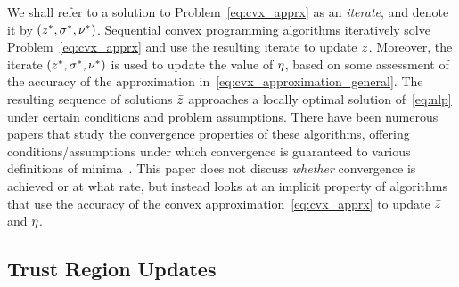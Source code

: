 \documentclass[letterpaper, 10 pt, conference]{ieeeconf}
\begin{document}
We shall refer to a solution to Problem~\eqref{eq:cvx_apprx} as an \textit{iterate}, and denote it by $(z^*,\sigma^*,\nu^*)$. Sequential convex programming algorithms iteratively solve Problem~\eqref{eq:cvx_apprx} and use the resulting iterate to update $\bar{z}$. Moreover, the iterate $(z^*,\sigma^*,\nu^*)$ is used to update the value of $\eta$, based on some assessment of the accuracy of the approximation in~\eqref{eq:cvx_approximation_general}. The resulting sequence of solutions $\bar{z}$ approaches a locally optimal solution of~\eqref{eq:nlp} under certain conditions and problem assumptions. There have been numerous papers that study the convergence properties of these algorithms, offering conditions/assumptions under which convergence is guaranteed to various definitions of minima~\cite{Mao2016a,Mao2018,Bonalli2019,Bonalli2019b}. This paper does not discuss \textit{whether} convergence is achieved or at what rate, but instead looks at an implicit property of algorithms that use the accuracy of the convex approximation~\eqref{eq:cvx_apprx} to update $\bar{z}$ and $\eta$.

\subsection{Trust Region Updates}\label{subsec:tr_updates}
\end{document}

